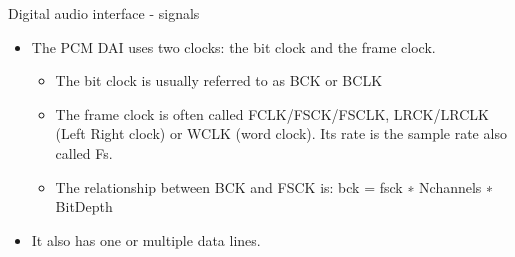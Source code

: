 \begin{frame}[fragile]{Digital audio interface - signals}
  \begin{itemize}
  \item The PCM DAI uses two clocks: the bit clock and the frame clock.
  \begin{itemize}
  \item The bit clock is usually referred to as BCK or BCLK
  \item The frame clock is often called FCLK/FSCK/FSCLK, LRCK/LRCLK
    (Left Right clock) or WCLK (word clock). Its rate is the sample
    rate also called Fs.
  \item The relationship between BCK and FSCK is: bck = fsck ∗
    Nchannels ∗ BitDepth
  \end{itemize}
  \item It also has one or multiple data lines.
  \end{itemize}
\end{frame}

